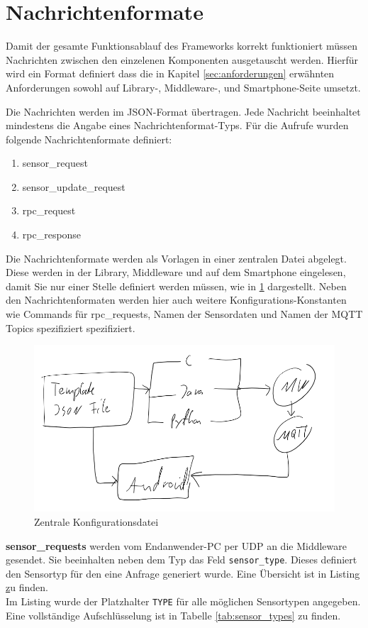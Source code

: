 \documentclass[11pt,a4paper]{report}
\begin{document}
\section{Nachrichtenformate}
Damit der gesamte Funktionsablauf des Frameworks korrekt funktioniert müssen Nachrichten zwischen den einzelenen Komponenten ausgetauscht werden.
Hierfür wird ein Format definiert dass die in Kapitel \ref{sec:anforderungen} erwähnten Anforderungen sowohl auf Library-, Middleware-, und Smartphone-Seite umsetzt.

Die Nachrichten werden im JSON-Format übertragen.
Jede Nachricht beeinhaltet mindestens die Angabe eines Nachrichtenformat-Typs.
Für die Aufrufe wurden folgende Nachrichtenformate definiert:
\begin{enumerate}
  \item sensor\_request
  \item sensor\_update\_request
  \item rpc\_request
  \item rpc\_response
\end{enumerate}
Die Nachrichtenformate werden als Vorlagen in einer zentralen Datei abgelegt.
Diese werden in der Library, Middleware und auf dem Smartphone eingelesen, damit Sie nur einer Stelle definiert werden müssen, wie in \ref*{fig:all_json} dargestellt.
Neben den Nachrichtenformaten werden hier auch weitere Konfigurations-Konstanten wie Commands für rpc\_requests, Namen der Sensordaten und Namen der MQTT Topics spezifiziert spezifiziert.


\begin{figure}[htbp]
  \centering
  \includegraphics[width=.9\textwidth]{images/all_json.png}
  \caption{Zentrale Konfigurationsdatei}
  \label{fig:all_json}
\end{figure}


\textbf{sensor\_requests} werden vom Endanwender-PC per UDP an die Middleware gesendet.
Sie beeinhalten neben dem Typ das Feld \texttt{sensor\_type}.
Dieses definiert den Sensortyp für den eine Anfrage generiert wurde.
Eine Übersicht ist in Listing \href{lst:sensor_request} zu finden.
\\
Im Listing wurde der Platzhalter \texttt{TYPE} für alle möglichen Sensortypen angegeben.
Eine vollständige Aufschlüsselung ist in Tabelle \ref{tab:sensor_types} zu finden.

\end{document}
